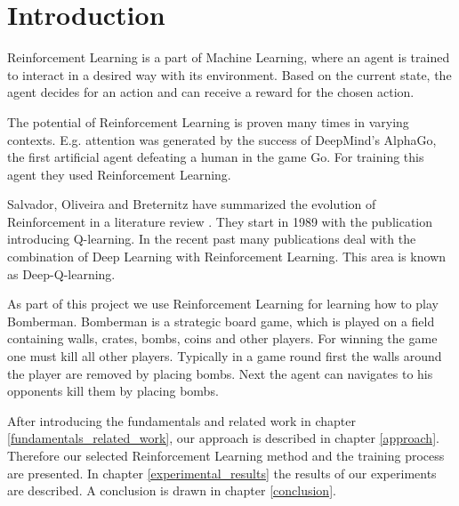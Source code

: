 \section{Introduction}

Reinforcement Learning is a part of Machine Learning, where an agent is trained to interact in a desired way with its environment. Based on the current state, the agent decides for an action and can receive a reward for the chosen action. \cite{salvadorReinforcementLearningLiterature2020}

The potential of Reinforcement Learning is proven many times in varying contexts. E.g. attention was generated by the success of DeepMind's AlphaGo, the first artificial agent defeating a human in the game Go. For training this agent they used Reinforcement Learning. \cite{Silver1140}

Salvador, Oliveira and Breternitz have summarized the evolution of Rein\-force\-ment in a literature review \cite{salvadorReinforcementLearningLiterature2020}. They start in 1989 with the publication introducing Q-learning. In the recent past many publications deal with the combination of Deep Learning with Reinforcement Learning. This area is known as Deep-Q-learning.

As part of this project we use Reinforcement Learning for learning how to play Bomberman. Bomberman is a strategic board game, which is played on a field containing walls, crates, bombs, coins and other players. For winning the game one must kill all other players. Typically in a game round first the walls around the player are removed by placing bombs. Next the agent can navigates to his opponents kill them by placing bombs. \cite{Kormelink2018}

After introducing the fundamentals and related work in chapter \ref{fundamentals_related_work}, our approach is described in chapter \ref{approach}. Therefore our selected Reinforcement Learning method and the training process are presented. In chapter \ref{experimental_results} the results of our experiments are described. A conclusion is drawn in chapter \ref{conclusion}.